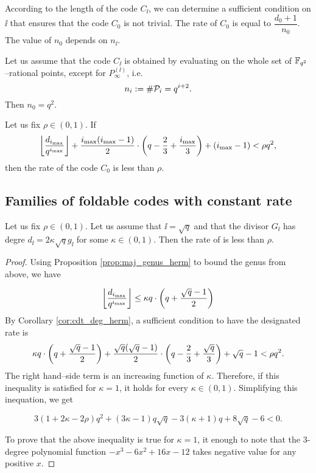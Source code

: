 \documentclass[10pt]{article}
\begin{document}
According to the length of the code $C_{\ii}$, we can determine a sufficient condition on $\ii$ that ensures that the code $C_0$ is not trivial. The rate of $C_0$ is equal to $\dfrac{d_0+1}{n_0}$. The value of $n_0$ depends on $n_{\ii}$.

Let us assume that the code $C_{\ii}$ is obtained by evaluating on the whole set of $\mathbb{F}_{q^2}$--rational points, except for $P_\infty^{(\ii)}$, i.e. 
\[n_i := \#\mathcal{P}_i = q^{i+2}.\]
Then $n_0=q^2$. 

\begin{corollary}\label{cor:cdt_deg_herm}
Let us fix $\rho \in (0,1)$. If
\[ \left\lfloor \dfrac{d_{i_{\rm{max}}}}{q^{i_{\rm{max}}}}\right\rfloor + \dfrac{i_{\rm{max}}(i_{\rm{max}}-1)}{2}\cdot \left(q-\frac{2}{3} + \frac{i_{\rm{max}}}{3}\right) + (i_{\rm{max}}-1) < \rho q^2,\]
then the rate of the code $C_0$ is less than $\rho$.
\end{corollary}

\subsection{Families of foldable codes with constant rate}


\begin{proposition}
	Let us fix $\rho \in (0,1)$. Let us assume that $\ii =\sqrt{q}$ and that the divisor $G_{\ii}$ has degre $d_{\ii} = 2\kappa \sqrt{q}g_{\ii}$ for some $\kappa \in (0,1)$.
	Then the rate of  is less than $\rho$.
\end{proposition}
\begin{proof}
	Using Proposition \ref{prop:maj_genus_herm} to bound the genus from above, we have
	
	\[ \left\lfloor\dfrac{d_{i_{\rm{max}}}}{q^{i_{\rm{max}}}}\right\rfloor \leq  \kappa q \cdot \left( q + \dfrac{\sqrt{q}-1}{2} \right)\]
	By Corollary \ref{cor:cdt_deg_herm}, a sufficient condition to have the designated rate is 
	\[\kappa q\cdot \left( q + \dfrac{\sqrt{q}-1}{2} \right)+\dfrac{\sqrt{q}(\sqrt{q}-1)}{2}\cdot \left(q-\frac{2}{3} + \frac{\sqrt{q}}{3}\right) + \sqrt{q}-1 < \rho q^2.\]
	The right hand--side term is an increasing function of $\kappa$. Therefore, if this inequality is satisfied for $\kappa=1$, it holds for every $\kappa \in (0,1)$. Simplifying this inequation, we get
		 
	
	\[3(1+2\kappa - 2\rho) q^2 + (3\kappa-1)q\sqrt{q}-3(\kappa+1)q+8\sqrt{q}-6 <0.\]
	
	
	To prove that the above inequality is true for $\kappa=1$, it enough to note that the 3-degree polynomial function $-x^3-6x^2+16x-12$ takes negative value for any positive $x$.
\end{proof}
\end{document}
